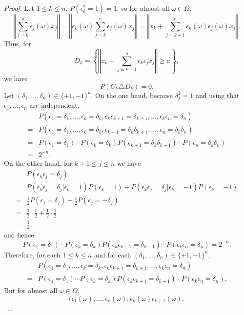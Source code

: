 \documentclass{article}
\newcommand{\norm}[1]{\left\Vert #1 \right\Vert}
\theoremstyle{definition}
\begin{document}
\begin{proof}
Let $1 \leq k \leq n$. $P(\epsilon_k^2=1)=1$, so for almost all $\omega \in \Omega$,
\[
\norm{\sum_{j=k}^n \epsilon_j(\omega) x_j} =
\norm{\epsilon_k(\omega) \sum_{j=k}^n \epsilon_j(\omega) x_j}
=\norm{x_k+\sum_{j=k+1}^n \epsilon_k(\omega) \epsilon_j(\omega) x_j}.
\]
Thus, for
\[
D_k = \left\{\norm{x_k+\sum_{j=k+1}^n \epsilon_k \epsilon_j x_j} \geq a\right\},
\]
we have
\[
P(C_k \triangle D_k)=0.
\]
Let $(\delta_1,\ldots,\delta_n) \in \{+1,-1\}^n$. On the one hand,
because $\delta_j^2=1$ and using that $\epsilon_1,\ldots,\epsilon_n$ are independent,
\[
\begin{split}
&P(\epsilon_1=\delta_1,\ldots,\epsilon_k=\delta_k,\epsilon_k
\epsilon_{k+1}=\delta_{k+1},\ldots,
\epsilon_k \epsilon_n=\delta_n)\\
=&P(\epsilon_1=\delta_1,\ldots,\epsilon_k=\delta_k,\epsilon_{k+1}=\delta_k
\delta_{k+1},\ldots,\epsilon_n=\delta_k \delta_n)\\
=&P(\epsilon_1=\delta_1)\cdots P(\epsilon_k=\delta_k)
P(\epsilon_{k+1}=\delta_k \delta_{k+1})
\cdots P(\epsilon_n=\delta_k \delta_n)\\
=&2^{-n}.
\end{split}
\]
On the other hand, 
for $k+1 \leq j \leq n$ we have
\[
\begin{split}
&P(\epsilon_k \epsilon_j = \delta_j)\\
=&P(\epsilon_k \epsilon_j = \delta_j | \epsilon_k=1)P(\epsilon_k=1)
+P(\epsilon_k \epsilon_j = \delta_j | \epsilon_k=-1) P(\epsilon_k=-1)\\
=&\frac{1}{2}P(\epsilon_j=\delta_j)+\frac{1}{2}P(\epsilon_j=-\delta_j)\\
=&\frac{1}{2}\cdot \frac{1}{2}+\frac{1}{2}\cdot \frac{1}{2}\\
=&\frac{1}{2},
\end{split}
\]
and hence
\[
P(\epsilon_1=\delta_1)\cdots P(\epsilon_k=\delta_k)
P(\epsilon_k \epsilon_{k+1}=\delta_{k+1})
\cdots P(\epsilon_k \epsilon_n = \delta_n)
=2^{-n}.
\]
Therefore, for each $1 \leq k \leq n$ and for each $(\delta_1,\ldots,\delta_n) \in \{+1,-1\}^n$,
\[
\begin{split}
&P(\epsilon_1=\delta_1,\ldots,\epsilon_k=\delta_k,\epsilon_k
\epsilon_{k+1}=\delta_{k+1},\ldots,
\epsilon_k \epsilon_n=\delta_n)\\
=&P(\epsilon_1=\delta_1)\cdots P(\epsilon_k=\delta_k)
P(\epsilon_k \epsilon_{k+1}=\delta_{k+1})
\cdots P(\epsilon_k \epsilon_n = \delta_n).
\end{split}
\]
But for almost all $\omega \in \Omega$,
\[
(\epsilon_1(\omega),\ldots,\epsilon_k(\omega),\epsilon_k(\omega) \epsilon_{k+1}(\omega),
\]
\end{proof}
\end{document}
